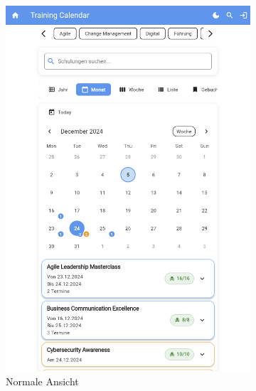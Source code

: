 \begin{figure}[htbp!]
    \centering
    \begin{subfigure}[b]{0.45\textwidth}
        \centering
        \includegraphics[scale=0.2]{img/flutter_05.png}
        \caption{Normale Ansicht}
        \label{fig:1}
    \end{subfigure}
    \hfill
    \begin{subfigure}[b]{0.45\textwidth}
        \centering

\end{subfigure}
\end{figure}
